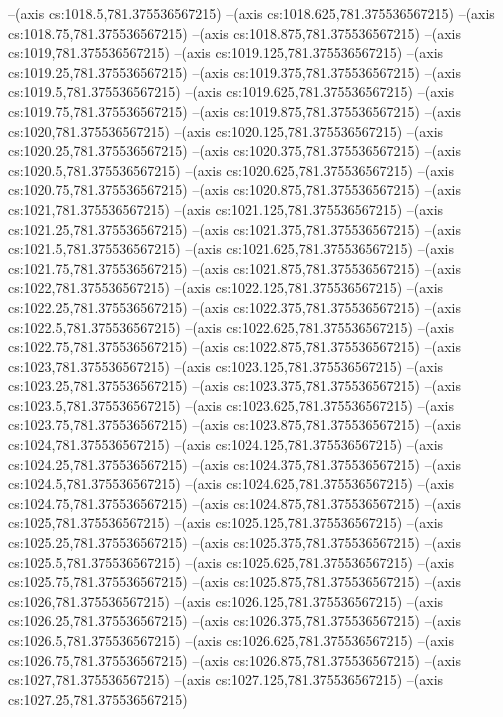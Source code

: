 --(axis cs:1018.5,781.375536567215)
--(axis cs:1018.625,781.375536567215)
--(axis cs:1018.75,781.375536567215)
--(axis cs:1018.875,781.375536567215)
--(axis cs:1019,781.375536567215)
--(axis cs:1019.125,781.375536567215)
--(axis cs:1019.25,781.375536567215)
--(axis cs:1019.375,781.375536567215)
--(axis cs:1019.5,781.375536567215)
--(axis cs:1019.625,781.375536567215)
--(axis cs:1019.75,781.375536567215)
--(axis cs:1019.875,781.375536567215)
--(axis cs:1020,781.375536567215)
--(axis cs:1020.125,781.375536567215)
--(axis cs:1020.25,781.375536567215)
--(axis cs:1020.375,781.375536567215)
--(axis cs:1020.5,781.375536567215)
--(axis cs:1020.625,781.375536567215)
--(axis cs:1020.75,781.375536567215)
--(axis cs:1020.875,781.375536567215)
--(axis cs:1021,781.375536567215)
--(axis cs:1021.125,781.375536567215)
--(axis cs:1021.25,781.375536567215)
--(axis cs:1021.375,781.375536567215)
--(axis cs:1021.5,781.375536567215)
--(axis cs:1021.625,781.375536567215)
--(axis cs:1021.75,781.375536567215)
--(axis cs:1021.875,781.375536567215)
--(axis cs:1022,781.375536567215)
--(axis cs:1022.125,781.375536567215)
--(axis cs:1022.25,781.375536567215)
--(axis cs:1022.375,781.375536567215)
--(axis cs:1022.5,781.375536567215)
--(axis cs:1022.625,781.375536567215)
--(axis cs:1022.75,781.375536567215)
--(axis cs:1022.875,781.375536567215)
--(axis cs:1023,781.375536567215)
--(axis cs:1023.125,781.375536567215)
--(axis cs:1023.25,781.375536567215)
--(axis cs:1023.375,781.375536567215)
--(axis cs:1023.5,781.375536567215)
--(axis cs:1023.625,781.375536567215)
--(axis cs:1023.75,781.375536567215)
--(axis cs:1023.875,781.375536567215)
--(axis cs:1024,781.375536567215)
--(axis cs:1024.125,781.375536567215)
--(axis cs:1024.25,781.375536567215)
--(axis cs:1024.375,781.375536567215)
--(axis cs:1024.5,781.375536567215)
--(axis cs:1024.625,781.375536567215)
--(axis cs:1024.75,781.375536567215)
--(axis cs:1024.875,781.375536567215)
--(axis cs:1025,781.375536567215)
--(axis cs:1025.125,781.375536567215)
--(axis cs:1025.25,781.375536567215)
--(axis cs:1025.375,781.375536567215)
--(axis cs:1025.5,781.375536567215)
--(axis cs:1025.625,781.375536567215)
--(axis cs:1025.75,781.375536567215)
--(axis cs:1025.875,781.375536567215)
--(axis cs:1026,781.375536567215)
--(axis cs:1026.125,781.375536567215)
--(axis cs:1026.25,781.375536567215)
--(axis cs:1026.375,781.375536567215)
--(axis cs:1026.5,781.375536567215)
--(axis cs:1026.625,781.375536567215)
--(axis cs:1026.75,781.375536567215)
--(axis cs:1026.875,781.375536567215)
--(axis cs:1027,781.375536567215)
--(axis cs:1027.125,781.375536567215)
--(axis cs:1027.25,781.375536567215)
